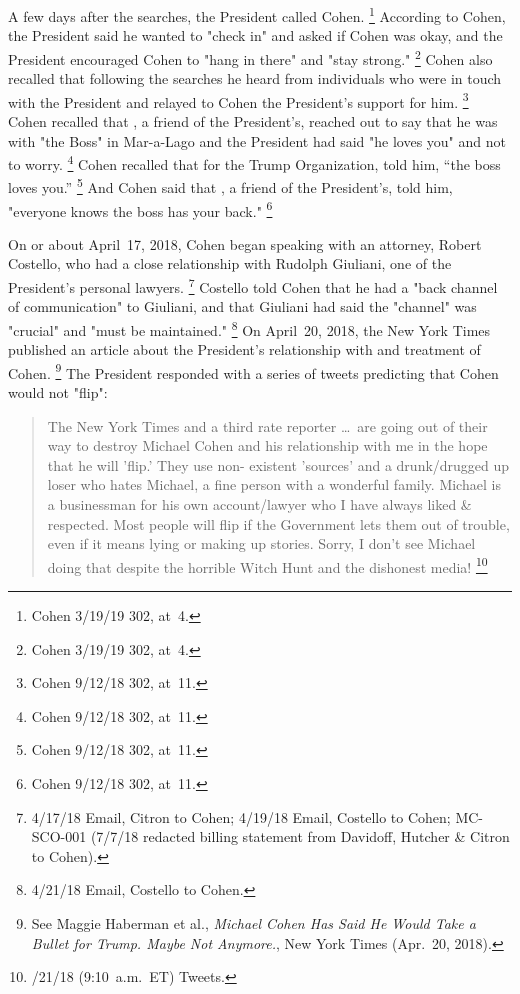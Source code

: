 A few days after the searches, the President called Cohen.%
\footnote{Cohen 3/19/19 302, at~4.}
According to Cohen, the President said he wanted to "check in" and asked if Cohen was okay, and the President encouraged Cohen to "hang in there" and "stay strong."%
\footnote{Cohen 3/19/19 302, at~4.}
Cohen also recalled that following the searches he heard from individuals who were in touch with the President and relayed to Cohen the President's support for him.%
\footnote{Cohen 9/12/18 302, at~11.}
Cohen recalled that , a friend of the President's, reached out to say that he was with "the Boss" in Mar-a-Lago and the President had said "he loves you" and not to worry.%
\footnote{Cohen 9/12/18 302, at~11.}
Cohen recalled that  for the Trump Organization, told him, ``the boss loves you.''%
\footnote{Cohen 9/12/18 302, at~11.}
And Cohen said that , a friend of the President's, told him, "everyone knows the boss has your back."%
\footnote{Cohen 9/12/18 302, at~11.}

On or about April~17, 2018, Cohen began speaking with an attorney, Robert Costello, who had a close relationship with Rudolph Giuliani, one of the President's personal lawyers.%
\footnote{4/17/18 Email, Citron to Cohen;
4/19/18 Email, Costello to Cohen;
MC-SCO-001 (7/7/18 redacted billing statement from Davidoff, Hutcher \& Citron to Cohen).}
Costello told Cohen that he had a "back channel of communication" to Giuliani, and that Giuliani had said the "channel" was "crucial" and "must be maintained."%
\footnote{4/21/18 Email, Costello to Cohen.}
On April~20, 2018, the New York Times published an article about the President's relationship with and treatment of Cohen.%
\footnote{See Maggie Haberman et al., \textit{Michael Cohen Has Said He Would Take a Bullet for Trump. Maybe Not Anymore.}, New York Times (Apr.~20, 2018).}
The President responded with a series of tweets predicting that Cohen would not "flip":

\begin{quote}
The New York Times and a third rate reporter \dots\ are going out of their way to destroy Michael Cohen and his relationship with me in the hope that he will 'flip.'
They use non- existent 'sources' and a drunk/drugged up loser who hates Michael, a fine person with a wonderful family.
Michael is a businessman for his own account/lawyer who I have always liked \& respected.
Most people will flip if the Government lets them out of trouble, even if it means lying or making up stories.
Sorry, I don't see Michael doing that despite the horrible Witch Hunt and the dishonest media!%
\footnote{/21/18 (9:10~a.m.~ET) Tweets.}
\end{quote}

